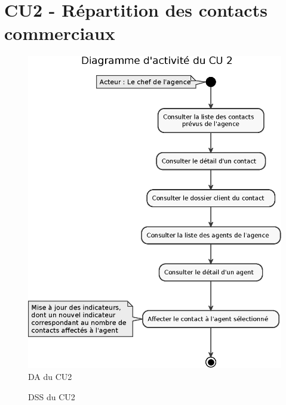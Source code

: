 \section{CU2 - Répartition des contacts commerciaux}

\begin{figure}[H]
\centering
\includegraphics[width=\textwidth]{figures/eps/DA_CU2.eps}
\caption{DA du CU2}
\end{figure}


\begin{figure}[H]
\noindent{}
\caption{DSS du CU2}
\end{figure}



